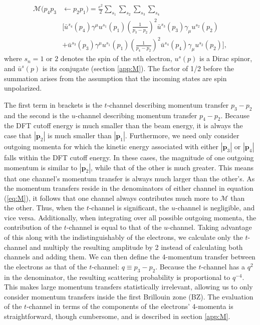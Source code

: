 \documentclass[twoside,twocolumn,9pt]{article}
\begin{document}
\begin{equation} 
  \label{eq:M} 
  \begin{aligned} 
    \mathcal{M}(p_4p_3&\leftarrow
    p_2p_1) 
    =
    \frac{e^2}{2} \sum_{s_1}\sum_{s_2}\sum_{s_3}\sum_{s_4} 
    \\& \bigg[
      \bar{u}^{s_4}\left(p_4\right)\gamma^{\mu}u^{s_1}\left(p_1\right)
      \left(\frac{1}{p_3 - p_2}\right)^2
      \bar{u}^{s_3}\left(p_3\right)\gamma_{\mu}u^{s_2}\left(p_2\right)
      \\&+ 
      \bar{u}^{s_3}\left(p_3\right)\gamma^{\mu}u^{s_1}\left(p_1\right)
      \left(\frac{1}{p_4 - p_2}\right)^2
      \bar{u}^{s_4}\left(p_4\right)\gamma_{\mu}u^{s_2}\left(p_2\right)
    \bigg],
  \end{aligned} 
\end{equation}
%
where $s_n = 1\text{ or }2$ denotes the spin of the $n$th electron, $u^s(p)$
is a Dirac spinor, and $\bar{u}^s(p)$ is its conjugate (section \ref{app:M}).
The factor of 1/2 before the summation arises from the assumption that the
incoming states are spin unpolarized.

The first term in brackets is the $t$-channel describing momentum transfer $p_3
- p_2$ and the second is the $u$-channel describing momentum transfer $p_4 -
p_2$.
Because the DFT cutoff energy is much smaller than the beam energy, it is
always the case that $|\mathbf{p}_2|$ is much smaller than $|\mathbf{p}_1|$.
Furthermore, we need only consider outgoing momenta for which the kinetic
energy associated with either $|\mathbf{p}_3|$ or $|\mathbf{p}_4|$ falls within
the DFT cutoff energy.
In these cases, the magnitude of one outgoing momentum is similar to
$|\mathbf{p}_2|$, while that of the other is much greater.
This means that one channel's momentum transfer is always much larger than the
other's.
As the momentum transfers reside in the denominators of either channel in
equation (\ref{eq:M}), it follows that one channel always contributes much more
to $\mathcal{M}$ than the other.
Thus, when the $t$-channel is significant, the $u$-channel is negligible, and
vice versa.
Additionally, when integrating over all possible outgoing momenta, the
contribution of the $t$-channel is equal to that of the $u$-channel.
Taking advantage of this along with the indistinguishably of the electrons, we
calculate only the $t$-channel and multiply the resulting amplitude by 2
instead of calculating both channels and adding them.
We can then define the 4-momentum transfer between the electrons as that of the
$t$-channel: $q\equiv p_3 - p_2$.
Because the $t$-channel has a $q^2$ in the denominator, the resulting
scattering probability is proportional to $q^{-4}$.
This makes large momentum transfers statistically irrelevant, allowing us to
only consider momentum transfers inside the first Brillouin zone (BZ).
The evaluation of the $t$-channel in terms of the
components of the electrons' 4-momenta is straightforward, though cumbersome,
and is described in section \ref{app:M}.
\end{document}
